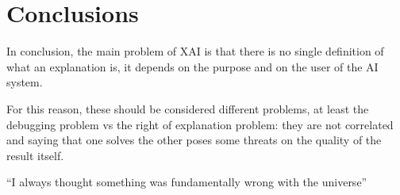 \documentclass[conference]{IEEEtran}
\begin{document}

\section{Conclusions}
\label{sec:conclusions}

In conclusion, the main problem of XAI is that there is no single definition of
what an explanation is, it depends on the purpose and on the user of the AI
system.

For this reason, these should be considered different problems, at least the
debugging problem vs the right of explanation problem: they are not correlated
and saying that one solves the other poses some threats on the quality of the
result itself.

``I always thought something was fundamentally wrong with the universe''



\end{document}
